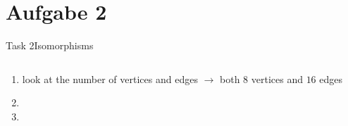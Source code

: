 
\section{Aufgabe 2}

\setcounter{task}{1}

\begin{frame}[allowframebreaks]{Task 2}{Isomorphisms}
  \begin{requirementsnoinc}
    \begin{columns}
      \begin{column}{0.5\textwidth}
      \end{column}
      \begin{column}{0.5\textwidth}
      \end{column}
    \end{columns}
  \end{requirementsnoinc}
  \begin{solutionnoinc}
    \begin{columns}
      \begin{column}{0.5\textwidth}
      \end{column}
      \begin{column}{0.5\textwidth}
      \end{column}
    \end{columns}
    \vspace{0.5cm}
    \begin{enumerate}
      \item look at the \alert{number} of \alert{vertices} and \alert{edges} $\rightarrow$ both $8$ vertices and $16$ edges
      \item[]
      \item[]
    \end{enumerate}
  \end{solutionnoinc}
  \begin{solutionnoinc}
    \begin{columns}
      \begin{column}{0.5\textwidth}
      \end{column}
      \begin{column}{0.5\textwidth}

\end{column}
\end{columns}
\end{solutionnoinc}
\end{frame}
